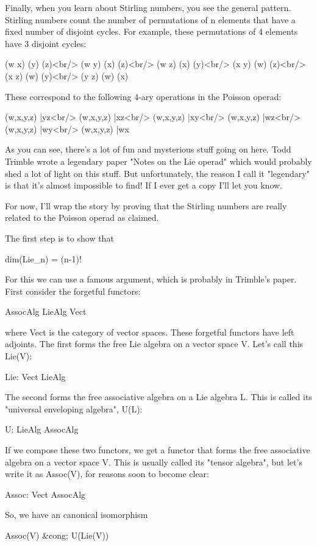 Finally, when you learn about Stirling numbers, you see the general
pattern.  Stirling numbers count the number of permutations of n
elements that have a fixed number of disjoint cycles.  For example,
these permutations of 4 elements have 3 disjoint cycles:

(w x) (y) (z)<br/>
(w y) (x) (z)<br/>
(w z) (x) (y)<br/>
(x y) (w) (z)<br/>
(x z) (w) (y)<br/>
(y z) (w) (x)

These correspond to the following 4-ary operations in the Poisson
operad:

(w,x,y,z) |yz<br/>
(w,x,y,z) |xz<br/>
(w,x,y,z) |xy<br/>
(w,x,y,z) |wz<br/>
(w,x,y,z) |wy<br/>
(w,x,y,z) |wx

As you can see, there's a lot of fun and mysterious stuff going on
here.  Todd Trimble wrote a legendary paper "Notes on the Lie
operad" which would probably shed a lot of light on this stuff.
But unfortunately, the reason I call it "legendary" is that
it's almost impossible to find!  If I ever get a copy I'll let you
know.

For now, I'll wrap the story by proving that the Stirling numbers
are really related to the Poisson operad as claimed.

The first step is to show that

dim(Lie_{n}) = (n-1)!  

For this we can use a famous argument, which is probably in Trimble's
paper.  First consider the forgetful functors:

AssocAlg \to  LieAlg \to  Vect

where Vect is the category of vector spaces.  These forgetful functors
have left adjoints.  The first forms the free Lie algebra on a vector
space V.  Let's call this Lie(V):

Lie: Vect \to  LieAlg

The second forms the free associative algebra on a Lie algebra L.
This is called its "universal enveloping algebra", U(L):

U: LieAlg \to  AssocAlg

If we compose these two functors, we get a functor that forms the free
associative algebra on a vector space V.  This is usually called its
"tensor algebra", but let's write it as Assoc(V), for reasons
soon to become clear:

Assoc: Vect \to  AssocAlg

So, we have an canonical isomorphism

Assoc(V) &cong; U(Lie(V))

